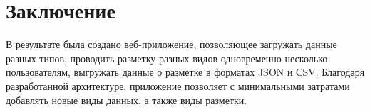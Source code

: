 \section*{Заключение}

В результате была создано веб-приложение, позволяющее загружать данные разных типов, проводить разметку разных видов одновременно
несколько пользователям, выгружать данные о разметке в форматах JSON и СSV. Благодаря разработанной архитектуре, приложение позволяет
с минимальными затратами добавлять новые виды данных, а также виды разметки.

